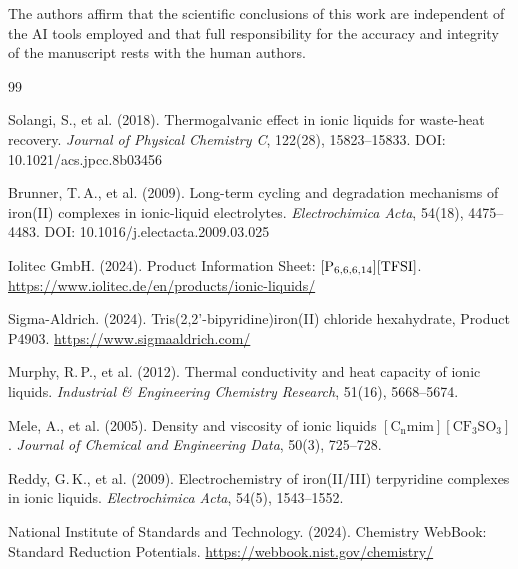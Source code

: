 \documentclass[11pt,a4paper]{article}
\begin{document}
The authors affirm that the scientific conclusions of this work are independent of the AI tools employed and that full responsibility for the accuracy and integrity of the manuscript rests with the human authors.

\begin{thebibliography}{99}

Solangi, S., et al. (2018).
Thermogalvanic effect in ionic liquids for waste-heat recovery.
\textit{Journal of Physical Chemistry C}, 122(28), 15823--15833.
DOI: 10.1021/acs.jpcc.8b03456

Brunner, T.\,A., et al. (2009).
Long-term cycling and degradation mechanisms of iron(II) complexes in ionic-liquid electrolytes.
\textit{Electrochimica Acta}, 54(18), 4475--4483.
DOI: 10.1016/j.electacta.2009.03.025

Iolitec GmbH. (2024).
Product Information Sheet: $[\ce{P_{6,6,6,14}}][\ce{TFSI}]$.
\url{https://www.iolitec.de/en/products/ionic-liquids/}

Sigma-Aldrich. (2024).
Tris(2,2'-bipyridine)iron(II) chloride hexahydrate, Product P4903.
\url{https://www.sigmaaldrich.com/}

Murphy, R.\,P., et al. (2012).
Thermal conductivity and heat capacity of ionic liquids.
\textit{Industrial \& Engineering Chemistry Research}, 51(16), 5668--5674.

Mele, A., et al. (2005).
Density and viscosity of ionic liquids $[\mathrm{C_n mim}][\mathrm{CF_3SO_3}]$.
\textit{Journal of Chemical and Engineering Data}, 50(3), 725--728.

Reddy, G.\,K., et al. (2009).
Electrochemistry of iron(II/III) terpyridine complexes in ionic liquids.
\textit{Electrochimica Acta}, 54(5), 1543--1552.

National Institute of Standards and Technology. (2024).
Chemistry WebBook: Standard Reduction Potentials.
\url{https://webbook.nist.gov/chemistry/}

\end{thebibliography}
\end{document}
